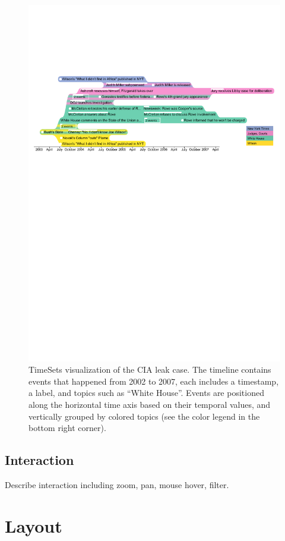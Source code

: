 \begin{figure}[!htb]
	\centering
	\includegraphics[width=\linewidth]{figure1}
	\caption{TimeSets visualization of the CIA leak case. The timeline contains events that happened from 2002 to 2007, each includes a timestamp, a label, and topics such as ``White House''. Events are positioned along the horizontal time axis based on their temporal values, and vertically grouped by colored topics (see the color legend in the bottom right corner).}
	\label{fig:ts-overview}
\end{figure}

\subsection{Interaction}
Describe interaction including zoom, pan, mouse hover, filter.

\section{Layout}
\label{sec:ts-algorithm}

